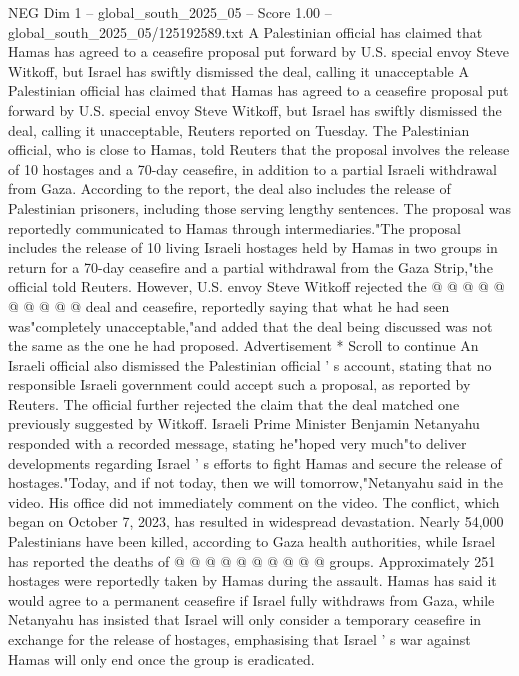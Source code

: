 \begin{textsample}{NEG Dim 1 – global\_south\_2025\_05 – Score 1.00 – global\_south\_2025\_05/125192589.txt}  \label{ex:f1_neg_380}
A Palestinian official has claimed that Hamas has agreed to a ceasefire proposal put forward by U.S. special envoy Steve Witkoff, but Israel has swiftly dismissed the deal, calling it unacceptable A Palestinian official has claimed that Hamas has agreed to a ceasefire proposal put forward by U.S. special envoy Steve Witkoff, but Israel has swiftly dismissed the deal, calling it unacceptable, Reuters reported on Tuesday.
The Palestinian official, who is close to Hamas, told Reuters that the proposal involves the release of 10 hostages and a 70-day ceasefire, in addition to a partial Israeli withdrawal from Gaza.
According to the report, the deal also includes the release of Palestinian prisoners, including those serving lengthy sentences.
The proposal was reportedly communicated to Hamas through intermediaries."The proposal includes the release of 10 living Israeli hostages held by Hamas in two groups in return for a 70-day ceasefire and a partial withdrawal from the Gaza Strip,"the official told Reuters.
However, U.S. envoy Steve Witkoff rejected the @ @ @ @ @ @ @ @ @ @ deal and ceasefire, reportedly saying that what he had seen was"completely unacceptable,"and added that the deal being discussed was not the same as the one he had proposed.
Advertisement * Scroll to continue An Israeli official also dismissed the Palestinian official ' s account, stating that no responsible Israeli government could accept such a proposal, as reported by Reuters.
The official further rejected the claim that the deal matched one previously suggested by Witkoff.
Israeli Prime Minister Benjamin Netanyahu responded with a recorded message, stating he"hoped very much"to deliver developments regarding Israel ' s efforts to fight Hamas and secure the release of hostages."Today, and if not today, then we will tomorrow,"Netanyahu said in the video.
His office did not immediately comment on the video.
The conflict, which began on October 7, 2023, has resulted in widespread devastation.
Nearly 54,000 Palestinians have been killed, according to Gaza health authorities, while Israel has reported the deaths of @ @ @ @ @ @ @ @ @ @ groups.
Approximately 251 hostages were reportedly taken by Hamas during the assault.
Hamas has said it would agree to a permanent ceasefire if Israel fully withdraws from Gaza, while Netanyahu has insisted that Israel will only consider a temporary ceasefire in exchange for the release of hostages, emphasising that Israel ' s war against Hamas will only end once the group is eradicated.

\end{textsample}
